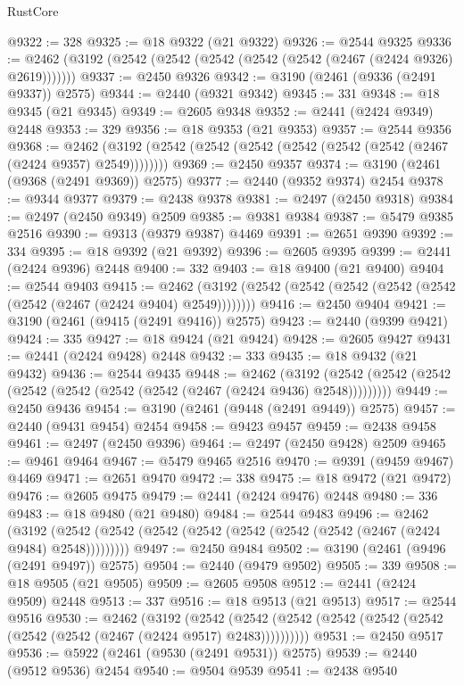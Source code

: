 \begin{lexlean}{RustCore}
\begin{coremodule}
@9322 := 328
@9325 := @18 @9322 (@21 @9322)
@9326 := @2544 @9325
@9336 := @2462 (@3192 (@2542 (@2542 (@2542 (@2542 (@2542 (@2467 (@2424 @9326) @2619)))))))
@9337 := @2450 @9326
@9342 := @3190 (@2461 (@9336 (@2491 @9337)) @2575)
@9344 := @2440 (@9321 @9342)
@9345 := 331
@9348 := @18 @9345 (@21 @9345)
@9349 := @2605 @9348
@9352 := @2441 (@2424 @9349) @2448
@9353 := 329
@9356 := @18 @9353 (@21 @9353)
@9357 := @2544 @9356
@9368 := @2462 (@3192 (@2542 (@2542 (@2542 (@2542 (@2542 (@2542 (@2467 (@2424 @9357) @2549))))))))
@9369 := @2450 @9357
@9374 := @3190 (@2461 (@9368 (@2491 @9369)) @2575)
@9377 := @2440 (@9352 @9374) @2454
@9378 := @9344 @9377
@9379 := @2438 @9378
@9381 := @2497 (@2450 @9318)
@9384 := @2497 (@2450 @9349) @2509
@9385 := @9381 @9384
@9387 := @5479 @9385 @2516
@9390 := @9313 (@9379 @9387) @4469
@9391 := @2651 @9390
@9392 := 334
@9395 := @18 @9392 (@21 @9392)
@9396 := @2605 @9395
@9399 := @2441 (@2424 @9396) @2448
@9400 := 332
@9403 := @18 @9400 (@21 @9400)
@9404 := @2544 @9403
@9415 := @2462 (@3192 (@2542 (@2542 (@2542 (@2542 (@2542 (@2542 (@2467 (@2424 @9404) @2549))))))))
@9416 := @2450 @9404
@9421 := @3190 (@2461 (@9415 (@2491 @9416)) @2575)
@9423 := @2440 (@9399 @9421)
@9424 := 335
@9427 := @18 @9424 (@21 @9424)
@9428 := @2605 @9427
@9431 := @2441 (@2424 @9428) @2448
@9432 := 333
@9435 := @18 @9432 (@21 @9432)
@9436 := @2544 @9435
@9448 := @2462
    (@3192 (@2542 (@2542 (@2542 (@2542 (@2542 (@2542 (@2542 (@2467 (@2424 @9436) @2548)))))))))
@9449 := @2450 @9436
@9454 := @3190 (@2461 (@9448 (@2491 @9449)) @2575)
@9457 := @2440 (@9431 @9454) @2454
@9458 := @9423 @9457
@9459 := @2438 @9458
@9461 := @2497 (@2450 @9396)
@9464 := @2497 (@2450 @9428) @2509
@9465 := @9461 @9464
@9467 := @5479 @9465 @2516
@9470 := @9391 (@9459 @9467) @4469
@9471 := @2651 @9470
@9472 := 338
@9475 := @18 @9472 (@21 @9472)
@9476 := @2605 @9475
@9479 := @2441 (@2424 @9476) @2448
@9480 := 336
@9483 := @18 @9480 (@21 @9480)
@9484 := @2544 @9483
@9496 := @2462
    (@3192 (@2542 (@2542 (@2542 (@2542 (@2542 (@2542 (@2542 (@2467 (@2424 @9484) @2548)))))))))
@9497 := @2450 @9484
@9502 := @3190 (@2461 (@9496 (@2491 @9497)) @2575)
@9504 := @2440 (@9479 @9502)
@9505 := 339
@9508 := @18 @9505 (@21 @9505)
@9509 := @2605 @9508
@9512 := @2441 (@2424 @9509) @2448
@9513 := 337
@9516 := @18 @9513 (@21 @9513)
@9517 := @2544 @9516
@9530 := @2462
    (@3192
      (@2542 (@2542 (@2542 (@2542 (@2542 (@2542 (@2542 (@2542 (@2467 (@2424 @9517) @2483))))))))))
@9531 := @2450 @9517
@9536 := @5922 (@2461 (@9530 (@2491 @9531)) @2575)
@9539 := @2440 (@9512 @9536) @2454
@9540 := @9504 @9539
@9541 := @2438 @9540

\end{coremodule}
\end{lexlean}
